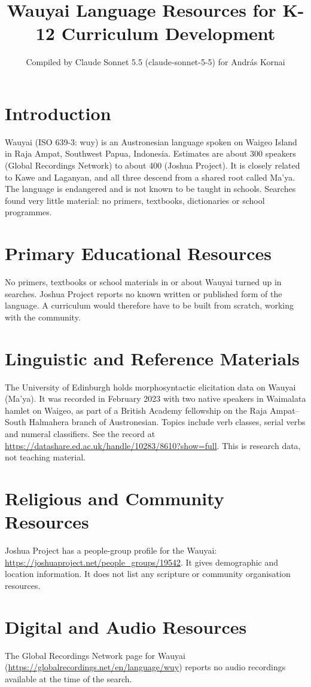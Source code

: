 \documentclass[12pt]{article}
\title{Wauyai Language Resources for K-12 Curriculum Development}
\author{Compiled by Claude Sonnet 5.5 (claude-sonnet-5-5) for Andr\'as Kornai}
\date{}
\begin{document}
\maketitle

\section{Introduction}
Wauyai (ISO 639-3: wuy) is an Austronesian language spoken on Waigeo Island in Raja Ampat, Southwest Papua, Indonesia. Estimates are about 300 speakers (Global Recordings Network) to about 400 (Joshua Project). It is closely related to Kawe and Laganyan, and all three descend from a shared root called Ma'ya. The language is endangered and is not known to be taught in schools. Searches found very little material: no primers, textbooks, dictionaries or school programmes.

\section{Primary Educational Resources}
No primers, textbooks or school materials in or about Wauyai turned up in searches. Joshua Project reports no known written or published form of the language. A curriculum would therefore have to be built from scratch, working with the community.

\section{Linguistic and Reference Materials}
The University of Edinburgh holds morphosyntactic elicitation data on Wauyai (Ma'ya). It was recorded in February 2023 with two native speakers in Waimalata hamlet on Waigeo, as part of a British Academy fellowship on the Raja Ampat--South Halmahera branch of Austronesian. Topics include verb classes, serial verbs and numeral classifiers. See the record at \url{https://datashare.ed.ac.uk/handle/10283/8610?show=full}. This is research data, not teaching material.

\section{Religious and Community Resources}
Joshua Project has a people-group profile for the Wauyai: \url{https://joshuaproject.net/people_groups/19542}. It gives demographic and location information. It does not list any scripture or community organisation resources.

\section{Digital and Audio Resources}
The Global Recordings Network page for Wauyai (\url{https://globalrecordings.net/en/language/wuy}) reports no audio recordings available at the time of the search.
\end{document}
